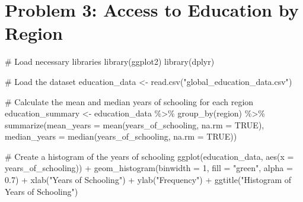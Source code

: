 \documentclass[
  letterpaper,
  DIV=11,
  numbers=noendperiod]{scrreprt}
\newenvironment{Shaded}{\begin{snugshade}}{\end{snugshade}}
\newcommand{\AttributeTok}[1]{\textcolor[rgb]{0.40,0.45,0.13}{#1}}
\newcommand{\CommentTok}[1]{\textcolor[rgb]{0.37,0.37,0.37}{#1}}
\newcommand{\ConstantTok}[1]{\textcolor[rgb]{0.56,0.35,0.01}{#1}}
\newcommand{\DecValTok}[1]{\textcolor[rgb]{0.68,0.00,0.00}{#1}}
\newcommand{\FloatTok}[1]{\textcolor[rgb]{0.68,0.00,0.00}{#1}}
\newcommand{\FunctionTok}[1]{\textcolor[rgb]{0.28,0.35,0.67}{#1}}
\newcommand{\NormalTok}[1]{\textcolor[rgb]{0.00,0.23,0.31}{#1}}
\newcommand{\OtherTok}[1]{\textcolor[rgb]{0.00,0.23,0.31}{#1}}
\newcommand{\SpecialCharTok}[1]{\textcolor[rgb]{0.37,0.37,0.37}{#1}}
\newcommand{\StringTok}[1]{\textcolor[rgb]{0.13,0.47,0.30}{#1}}
\begin{document}
\section*{Problem 3: Access to Education by
Region}\label{problem-3-access-to-education-by-region-1}


\begin{Shaded}
\begin{Highlighting}[]
\CommentTok{\# Load necessary libraries}
\FunctionTok{library}\NormalTok{(ggplot2)}
\FunctionTok{library}\NormalTok{(dplyr)}

\CommentTok{\# Load the dataset}
\NormalTok{education\_data }\OtherTok{\textless{}{-}} \FunctionTok{read.csv}\NormalTok{(}\StringTok{"global\_education\_data.csv"}\NormalTok{)}

\CommentTok{\# Calculate the mean and median years of schooling for each region}
\NormalTok{education\_summary }\OtherTok{\textless{}{-}}\NormalTok{ education\_data }\SpecialCharTok{\%\textgreater{}\%}
  \FunctionTok{group\_by}\NormalTok{(region) }\SpecialCharTok{\%\textgreater{}\%}
  \FunctionTok{summarize}\NormalTok{(}\AttributeTok{mean\_years =} \FunctionTok{mean}\NormalTok{(years\_of\_schooling, }\AttributeTok{na.rm =} \ConstantTok{TRUE}\NormalTok{),}
            \AttributeTok{median\_years =} \FunctionTok{median}\NormalTok{(years\_of\_schooling, }\AttributeTok{na.rm =} \ConstantTok{TRUE}\NormalTok{))}

\CommentTok{\# Create a histogram of the years of schooling}
\FunctionTok{ggplot}\NormalTok{(education\_data, }\FunctionTok{aes}\NormalTok{(}\AttributeTok{x =}\NormalTok{ years\_of\_schooling)) }\SpecialCharTok{+}
  \FunctionTok{geom\_histogram}\NormalTok{(}\AttributeTok{binwidth =} \DecValTok{1}\NormalTok{, }\AttributeTok{fill =} \StringTok{"green"}\NormalTok{, }\AttributeTok{alpha =} \FloatTok{0.7}\NormalTok{) }\SpecialCharTok{+}
  \FunctionTok{xlab}\NormalTok{(}\StringTok{"Years of Schooling"}\NormalTok{) }\SpecialCharTok{+} \FunctionTok{ylab}\NormalTok{(}\StringTok{"Frequency"}\NormalTok{) }\SpecialCharTok{+} 
  \FunctionTok{ggtitle}\NormalTok{(}\StringTok{"Histogram of Years of Schooling"}\NormalTok{)}


\end{Highlighting}
\end{Shaded}
\end{document}

